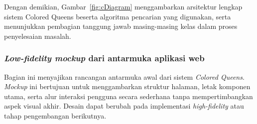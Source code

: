 \documentclass[a4paper,twoside]{article}
\begin{document}
	Dengan demikian, Gambar~\ref{fig:cDiagram} menggambarkan arsitektur lengkap sistem Colored Queens beserta algoritma pencarian yang digunakan, serta menunjukkan pembagian tanggung jawab masing-masing kelas dalam proses penyelesaian masalah.
	\subsubsection{\textit{Low-fidelity mockup} dari antarmuka aplikasi web}
	Bagian ini menyajikan rancangan antarmuka awal dari sistem \textit{Colored Queens}. \textit{Mockup} ini bertujuan untuk menggambarkan struktur halaman, letak komponen utama, serta alur interaksi pengguna secara sederhana tanpa mempertimbangkan aspek visual akhir. Desain dapat berubah pada implementasi \textit{high-fidelity} atau tahap pengembangan berikutnya.
	
\end{document}
